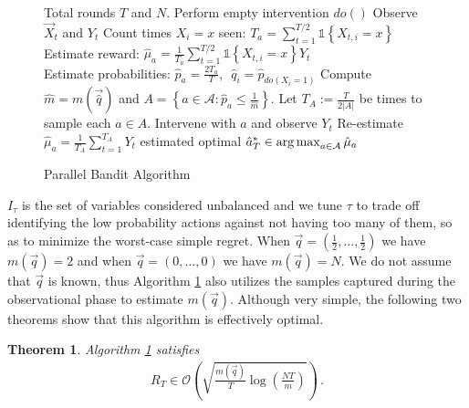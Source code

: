 \documentclass{article}
\newcommand{\set}[1]{\left\{#1\right\}}
\newcommand{\ind}[1]{\mathds{1}\!\!\set{#1}}
\newcommand{\argmax}{\operatornamewithlimits{arg\,max}}
\newcommand{\eq}[1]{\begin{align*}#1\end{align*}}
\newcommand{\bigo}[1]{\mathcal{O}\left( #1 \right)}
\newcommand{\simpleregret}{R_T}
\newcommand{\actions}{\mathcal{A}}
\theoremstyle{plain}
\newtheorem{theorem}{Theorem}
\theoremstyle{definition}
\begin{document}
\begin{figure}
\vspace{-25pt}
\begin{minipage}{.6\textwidth}
\begin{algorithm}[H]
\caption{Parallel Bandit Algorithm}\label{alg:simple}
\begin{algorithmic}[1]
 Total rounds $T$ and $N$.
\STATE Perform empty intervention $do()$
\STATE Observe $\vec{X}_t$ and $Y_t$
\ENDFOR
\FOR{$a = do(X_i = x) \in \actions$}
\STATE Count times $X_i = x$ seen: $T_a = \sum_{t=1}^{T/2} \ind{X_{t,i} = x}$
\STATE Estimate reward: $\hat{\mu}_a = \frac{1}{T_a} \sum_{t=1}^{T/2} \ind{X_{t,i} = x} Y_t$ \\[0.2cm]
\STATE Estimate probabilities: $\hat{p}_a = \frac{2 T_a}{T}$,\,\, $\hat q_i = \hat p_{do(X_i = 1)}$
\ENDFOR
\STATE Compute $\hat{m} = m(\vec{\hat q})$ and $A = \set{a \in \actions \colon \hat{p}_a \leq \frac{1}{\hat m}}$.
\STATE Let $T_A := \frac{T}{2 |A|}$ be times to sample each $a\in A$.
\STATE Intervene with $a$ and observe $Y_t$
\ENDFOR
\STATE Re-estimate $\hat{\mu}_a = \frac{1}{T_A} \sum_{t=1}^{T_A} Y_t$
\ENDFOR
\RETURN estimated optimal $\hat{a}^*_T \in \argmax_{a\in\actions} \hat{\mu}_a$
\end{algorithmic}
\end{algorithm}
\end{minipage}
\end{figure}

$I_\tau$ is the set of variables considered unbalanced and we tune $\tau$ to trade off identifying the low probability actions against not having too many of them, so as to minimize the worst-case simple regret. When $\vec{q} = (\frac{1}{2}, \ldots, \frac{1}{2})$ we have $m(\vec{q}) = 2$ and when $\vec{q} = (0, \ldots, 0)$ we have $m(\vec{q}) = N$. We do not assume that $\vec{q}$ is known, thus Algorithm \ref{alg:simple} also utilizes the samples captured during the observational phase to estimate $m(\vec{q})$. Although very simple, the following two theorems show that this algorithm is effectively optimal.



\begin{theorem}\label{thm:uq-simple}
Algorithm \ref{alg:simple} satisfies
\eq{
\simpleregret \in \bigo{\sqrt{\frac{m(\vec{q})}{T}\log\left(\frac{NT}{m}\right)}}\,.
}
\end{theorem}
\end{document}
